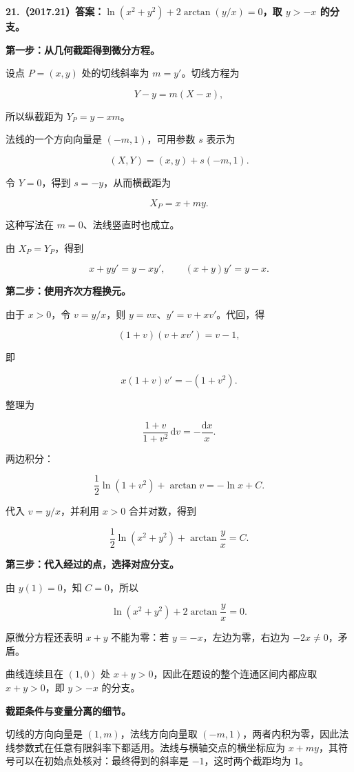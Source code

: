 \documentclass[UTF8,11pt,fontset=windows]{ctexart}
\begin{document}
\clearpage

\textbf{21.（2017.21）答案：$\ln(x^2+y^2)+2\arctan(y/x)=0$，取 $y>-x$ 的分支。}

\textbf{第一步：从几何截距得到微分方程。}

设点 $P=(x,y)$ 处的切线斜率为 $m=y'$。切线方程为

$$
Y-y=m(X-x),
$$

所以纵截距为 $Y_P=y-xm$。

法线的一个方向向量是 $(-m,1)$，可用参数 $s$ 表示为

$$
(X,Y)=(x,y)+s(-m,1).
$$

令 $Y=0$，得到 $s=-y$，从而横截距为

$$
X_P=x+my.
$$

这种写法在 $m=0$、法线竖直时也成立。

由 $X_P=Y_P$，得到

$$
x+yy'=y-xy',
\qquad (x+y)y'=y-x.
$$

\textbf{第二步：使用齐次方程换元。}

由于 $x>0$，令 $v=y/x$，则 $y=vx$、$y'=v+xv'$。代回，得

$$
(1+v)(v+xv')=v-1,
$$

即

$$
x(1+v)v'=-(1+v^2).
$$

整理为

$$
\frac{1+v}{1+v^2}\,\mathrm dv=-\frac{\mathrm dx}{x}.
$$

两边积分：

$$
\frac12\ln(1+v^2)+\arctan v=-\ln x+C.
$$

代入 $v=y/x$，并利用 $x>0$ 合并对数，得到

$$
\frac12\ln(x^2+y^2)+\arctan\frac yx=C.
$$

\textbf{第三步：代入经过的点，选择对应分支。}

由 $y(1)=0$，知 $C=0$，所以

$$
\ln(x^2+y^2)+2\arctan\frac yx=0.
$$

原微分方程还表明 $x+y$ 不能为零：若 $y=-x$，左边为零，右边为 $-2x\ne0$，矛盾。

曲线连续且在 $(1,0)$ 处 $x+y>0$，因此在题设的整个连通区间内都应取 $x+y>0$，即 $y>-x$ 的分支。

\textbf{截距条件与变量分离的细节。}

切线的方向向量是 $(1,m)$，法线方向向量取 $(-m,1)$，两者内积为零，因此法线参数式在任意有限斜率下都适用。法线与横轴交点的横坐标应为 $x+my$，其符号可以在初始点处核对：最终得到的斜率是 $-1$，这时两个截距均为 $1$。
\end{document}

